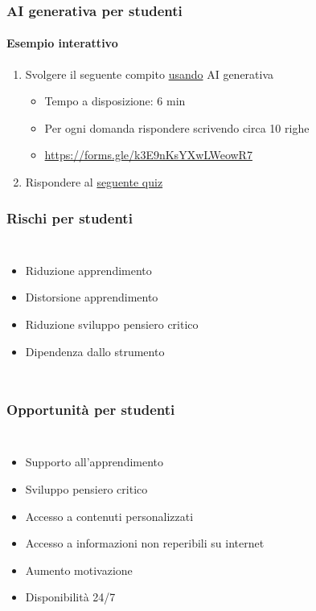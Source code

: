 \begin{exerciseframe}
    \frametitle{AI generativa per studenti}
    \framesubtitle{Esempio interattivo}

    \begin{enumerate}
        \item Svolgere il seguente compito \underline{usando} AI generativa
        \begin{itemize}
            \item Tempo a disposizione: 6 min
            \item Per ogni domanda rispondere scrivendo circa 10 righe
            \item \url{https://forms.gle/k3E9nKsYXwLWeowR7}
        \end{itemize}

        \pause
        \bigskip
        \item Rispondere al \href{https://play.blooket.com/host?id=678cef9809b01a90328de16a}{seguente quiz}
    \end{enumerate}
\end{exerciseframe}

\begin{contentframe}
    \frametitle{Rischi per studenti}

    \begin{columns}
        \begin{itemize}
            \item Riduzione apprendimento
            \item Distorsione apprendimento
            \item Riduzione sviluppo pensiero critico
            \item Dipendenza dallo strumento
        \end{itemize}
        
        \centering
    \end{columns}
\end{contentframe}

\begin{contentframe}
    \frametitle{Opportunità per studenti}

    \begin{columns}
        \begin{itemize}
            \item Supporto all'apprendimento
            \item Sviluppo pensiero critico
            \item Accesso a contenuti personalizzati
            \item Accesso a informazioni non reperibili su internet
            \item Aumento motivazione
            \item Disponibilità 24/7
        \end{itemize}
        
        \centering
    \end{columns}
\end{contentframe}

